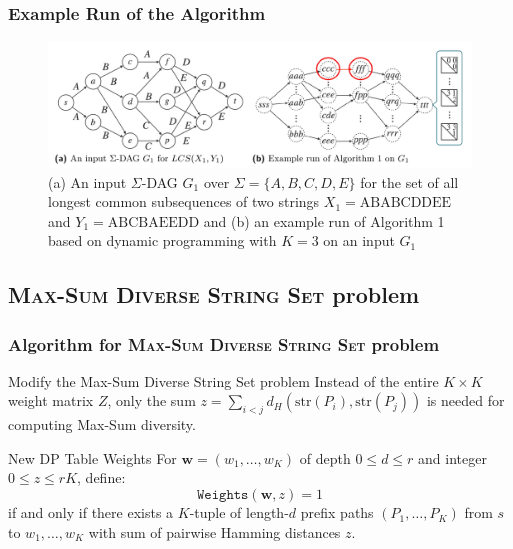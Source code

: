\documentclass{beamer}
\begin{document}
\begin{frame}
    \frametitle{Example Run of the Algorithm}
    \begin{figure}[h]
        \centering
        \includegraphics[width=1\textwidth]{6Kc2XEQ.png}
        \caption{(a) An input $\Sigma$-DAG $G_1$ over $\Sigma = \{A, B, C, D, E\}$ for the set of all longest common subsequences of two strings $X_1 = \text{ABABCDDEE}$ and $Y_1 = \text{ABCBAEEDD}$ and (b) an example run of Algorithm 1 based on dynamic programming with $K = 3$ on an input $G_1$}
        \label{fig:example}
    \end{figure}




\end{frame}


\subsection{\textsc{Max-Sum Diverse String Set} problem}
\begin{frame}
    \frametitle{Algorithm for \textsc{Max-Sum Diverse String Set} problem}
    \begin{block}{Modify the Max-Sum Diverse String Set problem}
        Instead of the entire \( K \times K \) weight matrix \( Z \), only the sum \( z = \sum_{i<j} d_H(\text{str}(P_i), \text{str}(P_j)) \) is needed for computing Max-Sum diversity.
    \end{block}

    \begin{block}{New DP Table Weights}
        For \( \mathbf{w} = (w_1, \dots, w_K) \) of depth \( 0 \leq d  \leq r\) and integer \( 0 \leq z \leq rK \), define:
        \[
            \texttt{Weights}(\mathbf{w}, z) = 1
        \]
        if and only if there exists a \( K \)-tuple of length-\( d \) prefix paths \( (P_1, \dots, P_K) \) from \( s \) to \( w_1, \dots, w_K \) with sum of pairwise Hamming distances \( z \).
    \end{block}

\end{frame}
\end{document}
